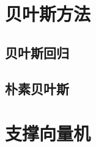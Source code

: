 
\section{贝叶斯方法} %
\label{sec:贝叶斯方法}

\subsection{贝叶斯回归} %
\label{sub:贝叶斯回归}


\subsection{朴素贝叶斯} %
\label{sub:朴素贝叶斯}






\section{支撑向量机} %
\label{sec:支撑向量机}



